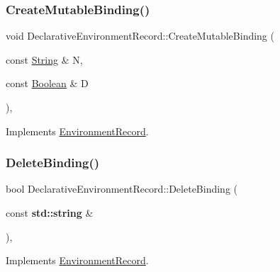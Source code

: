 \subsubsection{\texorpdfstring{Create\+Mutable\+Binding()}{CreateMutableBinding()}\hspace{0.1cm}{\footnotesize\ttfamily [2/2]}}
{\footnotesize\ttfamily void Declarative\+Environment\+Record\+::\+Create\+Mutable\+Binding (\begin{DoxyParamCaption}\item[{const \hyperlink{struct_string}{String} \&}]{N,  }\item[{const \hyperlink{struct_boolean}{Boolean} \&}]{D }\end{DoxyParamCaption})\hspace{0.3cm}{\ttfamily [final]}, {\ttfamily [virtual]}}



Implements \hyperlink{struct_environment_record_aded45e79485e73e080980e6ff611dc0d}{Environment\+Record}.

\mbox{\label{struct_declarative_environment_record_ae21d2a351ca2b69110f11ffe13fd2380}} 
\subsubsection{\texorpdfstring{Delete\+Binding()}{DeleteBinding()}\hspace{0.1cm}{\footnotesize\ttfamily [1/2]}}
{\footnotesize\ttfamily bool Declarative\+Environment\+Record\+::\+Delete\+Binding (\begin{DoxyParamCaption}\item[{const \textbf{ std\+::string} \&}]{ }\end{DoxyParamCaption})\hspace{0.3cm}{\ttfamily [final]}, {\ttfamily [virtual]}}



Implements \hyperlink{struct_environment_record_a41079a3969168b9fc4839fd89aa14dc0}{Environment\+Record}.

\mbox{\label{struct_declarative_environment_record_a853cee614241af5f32d9d3cb11d7e6d6}} 
